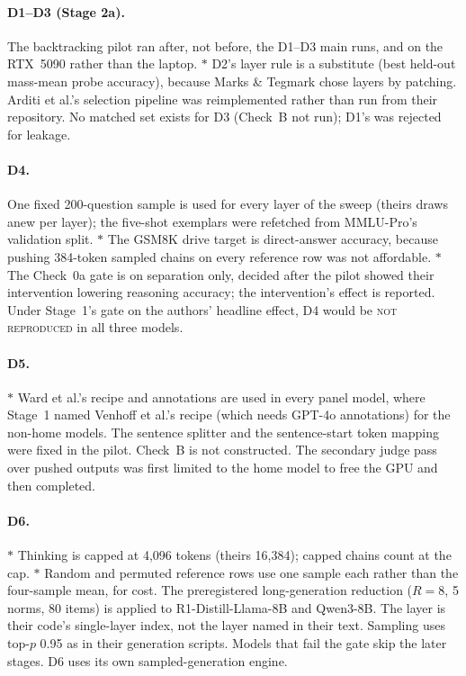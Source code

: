 \documentclass[11pt]{article}
\newcommand{\verdict}[1]{\textsc{\MakeLowercase{#1}}}
\begin{document}
\paragraph{D1--D3 (Stage 2a).} The backtracking pilot ran after, not before, the D1--D3 main runs, and on the RTX~5090 rather than the laptop. $\ast$ D2's layer rule is a substitute (best held-out mass-mean probe accuracy), because Marks \& Tegmark chose layers by patching. Arditi et al.'s selection pipeline was reimplemented rather than run from their repository. No matched set exists for D3 (Check~B not run); D1's was rejected for leakage.

\paragraph{D4.} One fixed 200-question sample is used for every layer of the sweep (theirs draws anew per layer); the five-shot exemplars were refetched from MMLU-Pro's validation split. $\ast$ The GSM8K drive target is direct-answer accuracy, because pushing 384-token sampled chains on every reference row was not affordable. $\ast$ The Check~0a gate is on separation only, decided after the pilot showed their intervention lowering reasoning accuracy; the intervention's effect is reported. Under Stage~1's gate on the authors' headline effect, D4 would be \verdict{NOT REPRODUCED} in all three models.

\paragraph{D5.} $\ast$ Ward et al.'s recipe and annotations are used in every panel model, where Stage~1 named Venhoff et al.'s recipe (which needs GPT-4o annotations) for the non-home models. The sentence splitter and the sentence-start token mapping were fixed in the pilot. Check~B is not constructed. The secondary judge pass over pushed outputs was first limited to the home model to free the GPU and then completed.

\paragraph{D6.} $\ast$ Thinking is capped at 4,096 tokens (theirs 16,384); capped chains count at the cap. $\ast$ Random and permuted reference rows use one sample each rather than the four-sample mean, for cost. The preregistered long-generation reduction ($R = 8$, 5 norms, 80 items) is applied to R1-Distill-Llama-8B and Qwen3-8B. The layer is their code's single-layer index, not the layer named in their text. Sampling uses top-$p$ 0.95 as in their generation scripts. Models that fail the gate skip the later stages. D6 uses its own sampled-generation engine.
\end{document}
